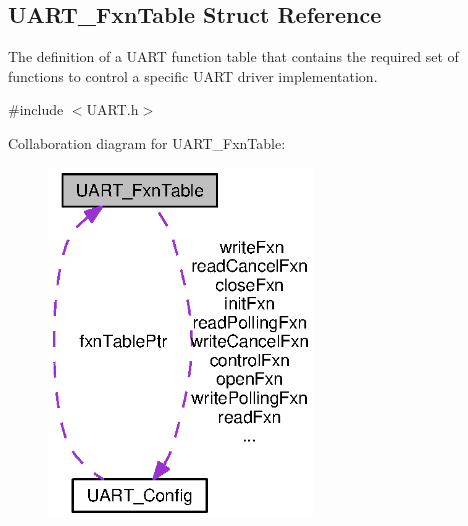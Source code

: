 \subsection{U\+A\+R\+T\+\_\+\+Fxn\+Table Struct Reference}
\label{struct_u_a_r_t___fxn_table}


The definition of a U\+A\+R\+T function table that contains the required set of functions to control a specific U\+A\+R\+T driver implementation.  




{\ttfamily \#include $<$U\+A\+R\+T.\+h$>$}



Collaboration diagram for U\+A\+R\+T\+\_\+\+Fxn\+Table\+:
\nopagebreak
\begin{figure}[H]
\begin{center}
\leavevmode
\includegraphics[width=199pt]{struct_u_a_r_t___fxn_table__coll__graph}
\end{center}
\end{figure}
